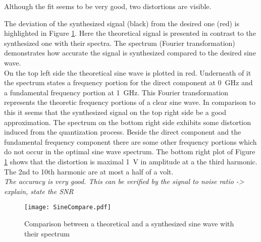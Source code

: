 Although the fit seems to be very good, two distortions are visible. 

The deviation of the synthesized signal (black) from the desired one (red) is highlighted in Figure \ref{fig:SineCompare}.
Here the theoretical signal is presented in contrast to the synthesized one with their spectra.
The spectrum (Fourier transformation) demonstrates how accurate the signal is synthesized compared to the desired sine wave.\\
On the top left side the theoretical sine wave is plotted in red. Underneath of it the spectrum states a frequency portion for the direct component at \SI{0} {\GHz} and a fundamental frequency portion at \SI{1}{\GHz}.
This Fourier transformation represents the theoretic frequency portions of a clear sine wave. 
In comparison to this it seems that the synthesized signal on the top right side be a good approximation.
The spectrum on the bottom right side exhibits some distortion induced from the quantization process. 
Beside the direct component and the fundamental frequency component there are some other frequency portions which do not occur in the optimal sine wave spectrum.
The bottom right plot of Figure \ref{fig:SineCompare} shows that the distortion is maximal \SI{1}{\volt} in amplitude at a the third harmonic. The 2nd to 10th harmonic are at most a half of a volt.\\
\textit{The accuracy is very good. This can be verified by the signal to noise ratio -> explain, state the SNR}

\begin{figure}[htb!]
	\centering
  \texttt{[image: SineCompare.pdf]}
	\caption{Comparison between a theoretical and a synthesized sine wave with their spectrum}
	\label{fig:SineCompare}
\end{figure}

